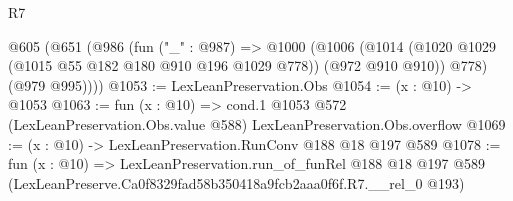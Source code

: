 \begin{lexlean}{R7}
\begin{coremodule}
  @605
    (@651
      (@986
        (fun ("_" : @987) =>
        @1000
          (@1006
            (@1014 (@1020 @1029 (@1015 @55 @182 @180 @910 @196 @1029 @778)) (@972 @910 @910))
            @778)
          (@979 @995))))
@1053 := LexLeanPreservation.Obs
@1054 := (x : @10) -> @1053
@1063 := fun (x : @10) =>
  cond.{1} @1053 @572 (LexLeanPreservation.Obs.value @588) LexLeanPreservation.Obs.overflow
@1069 := (x : @10) -> LexLeanPreservation.RunConv @188 @18 @197 @589
@1078 := fun (x : @10) =>
  LexLeanPreservation.run_of_funRel
    @188
    @18
    @197
    @589
    (LexLeanPreserve.Ca0f8329fad58b350418a9fcb2aaa0f6f.R7.__rel_0 @193)
\end{coremodule}
\end{lexlean}
